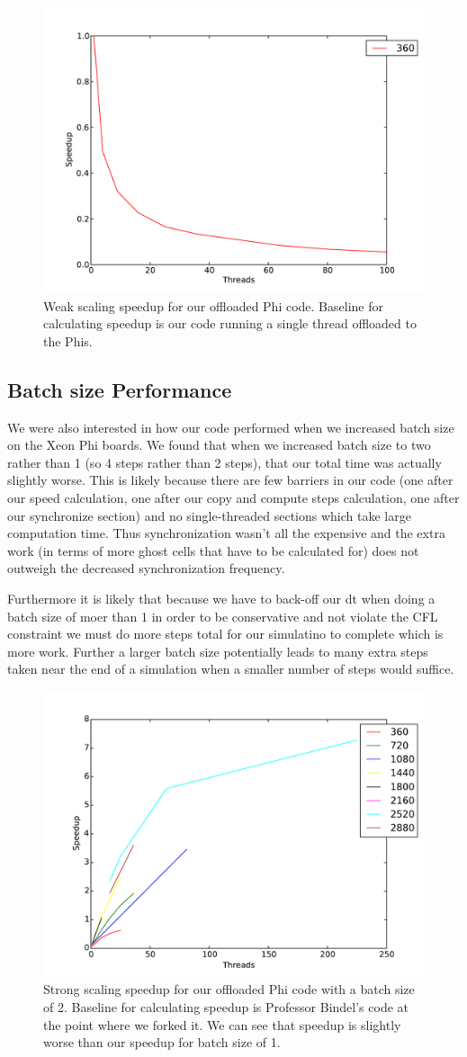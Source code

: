 \documentclass[11pt]{article}
\begin{document}
\begin{figure}[h!]
\includegraphics[width=0.5\linewidth]{mic_weak_mic_baseline.pdf}
\caption{Weak scaling speedup for our offloaded Phi code. Baseline for calculating speedup is our code running a single thread offloaded to the Phis.}
\end{figure}

\subsection{Batch size Performance}

We were also interested in how our code performed when we increased batch size on the Xeon Phi boards. We found that when we increased batch size to two rather than 1 (so 4 steps rather than 2 steps), that our total time was actually slightly worse. This is likely because there are few barriers in our code (one after our speed calculation, one after our copy and compute steps calculation, one after our synchronize section) and no single-threaded sections which take large computation time. Thus synchronization wasn't all the expensive and the extra work (in terms of more ghost cells that have to be calculated for) does not outweigh the decreased synchronization frequency.

Furthermore it is likely that because we have to back-off our dt when doing a batch size of moer than 1 in order to be conservative and not violate the CFL constraint we must do more steps total for our simulatino to complete which is more work. Further a larger batch size potentially leads to many extra steps taken near the end of a simulation when a smaller number of steps would suffice.

\begin{figure}[h!]
\includegraphics[width=0.5\linewidth]{mic_strong_bindel_baseline_batchsize2.pdf}
\caption{Strong scaling speedup for our offloaded Phi code with a batch size of 2. Baseline for calculating speedup is Professor Bindel's code at the point where we forked it. We can see that speedup is slightly worse than our speedup for batch size of 1.}
\end{figure}
\end{document}
